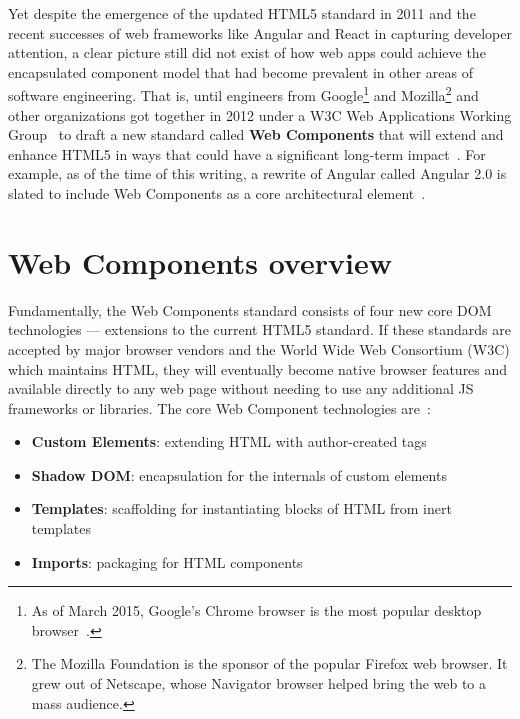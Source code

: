 Yet despite the emergence of the updated HTML5 standard in 2011 and the recent successes of web frameworks like Angular and React in capturing developer attention, 
a clear picture still did not exist of how web apps could achieve the encapsulated component model that had become prevalent in other areas of software engineering.
That is, until engineers from Google\footnote{
As of March 2015, Google's Chrome browser is the most popular desktop browser~\cite{zachte2015}.}
and Mozilla\footnote{
The Mozilla Foundation is the sponsor of the popular Firefox web browser. It grew out of Netscape, whose Navigator browser helped bring the web to a mass audience.}
and other organizations got together in 2012 under a W3C Web Applications Working Group~\cite{w3c2015} 
to draft a new standard called \textbf{Web Components} that will extend and enhance HTML5 in ways that could have a significant long-term impact~\cite{yveslafon2015}. 
For example, as of the time of this writing, a rewrite of Angular called Angular 2.0 is slated to include Web Components as a core architectural element~\cite{santiagoesteva2015}.

\section{Web Components overview}
Fundamentally, the Web Components standard consists of four new core DOM technologies --- extensions to the current HTML5 standard.
If these standards are accepted by major browser vendors and the World Wide Web Consortium (W3C)
which maintains HTML, 
they will eventually become native browser features and available directly to any web page without needing to use any additional JS frameworks or libraries. 
The core Web Component technologies are~\cite{penades2015}:
\begin{itemize}
\item
\textbf{Custom Elements}: extending HTML with author-created tags
\item
\textbf{Shadow DOM}: encapsulation for the internals of custom elements
\item
\textbf{Templates}: scaffolding for instantiating blocks of HTML from inert templates
\item
\textbf{Imports}: packaging for HTML components
\end{itemize}

